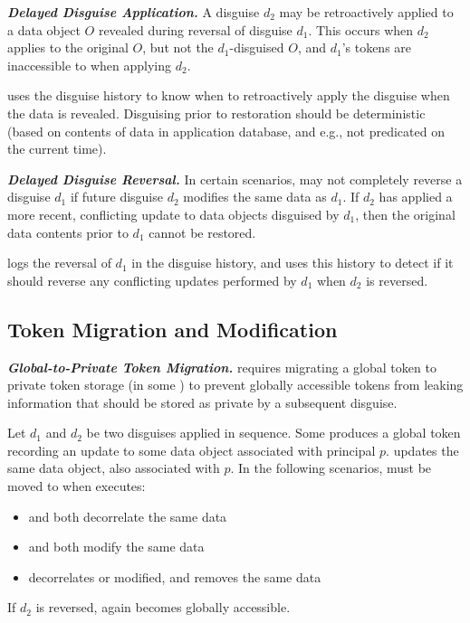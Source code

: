 \noindent\textbf{\emph{Delayed Disguise Application.}}
A disguise $d_2$ may be retroactively applied to a data object $O$ revealed during reversal of
disguise $d_1$.  This occurs when $d_2$ applies to the original $O$, but not the $d_1$-disguised
$O$, and $d_1$'s tokens are inaccessible to \sys when applying $d_2$.

\sys uses the disguise history to know when to retroactively apply the
disguise when the data is revealed.  Disguising prior to restoration should be deterministic (based
on contents of data in application database, and e.g., not predicated on the current time).

\vspace{6pt}\noindent\textbf{\emph{Delayed Disguise Reversal.}}
In certain scenarios, \sys may not completely reverse a disguise $d_1$ if future disguise $d_2$
modifies the same data as $d_1$. If $d_2$ has applied a more recent, conflicting update to data
objects disguised by $d_1$, then the original data contents prior to $d_1$ cannot be restored. 

\sys logs the reversal of $d_1$ in the disguise history, and uses this history to detect if it
should reverse any conflicting updates performed by $d_1$ when $d_2$ is reversed.

\subsection{Token Migration and Modification}
\noindent\textbf{\emph{Global-to-Private Token Migration.}}
\sys requires migrating a global token to private token storage (in some ) to prevent
globally accessible tokens from leaking information that should be stored as private by a subsequent
disguise.

Let $d_1$ and $d_2$ be two disguises applied in sequence.
Some  produces a global token  recording an update to some data object
associated with principal $p$.  updates the same data object, also associated with $p$.
In the following scenarios,  must be moved to  when  executes:
\begin{itemize}
\item {} and  both decorrelate the same data
\item {} and  both modify the same data
\item {} decorrelates or modified, and  removes the same data
\end{itemize}
If $d_2$ is reversed,  again becomes globally accessible.

